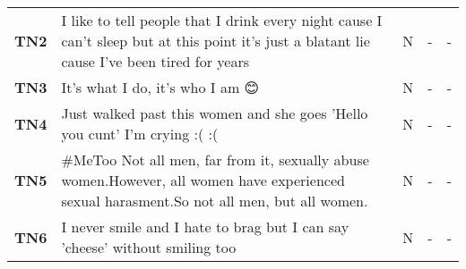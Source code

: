 \begin{table}
\begin{tabular}{lp{12cm}ccc}
        \textbf{TN2}      & I like to tell people that I drink every night cause I can't sleep but at this point it's just a blatant lie cause I've been tired for years                                                                                                                                                                                                 & N                                        & -                                   & -                                          \\
        \textbf{TN3}      & It's what I do, it's who I am 😊                                                                                                                                                                                                                                                                                                              & N                                        & -                                   & -                                          \\
        \textbf{TN4}      & Just walked past this women and she goes 'Hello you cunt' I'm crying :( :(                                                                                                                                                                                                                                                                   & N                                        & -                                   & -                                          \\
        \textbf{TN5}      & \#MeToo Not all men, far from it, sexually abuse women.However, all women have experienced sexual harasment.So not all men, but all women.                                                                                                                                                                                                   & N                                        & -                                   & -                                          \\
        \textbf{TN6}      & I never smile and I hate to brag but I can say 'cheese' without smiling too                                                                                                                                                                                                                                                                  & N                                        & -                                   & -                                          \\

\end{tabular}
\end{table}
